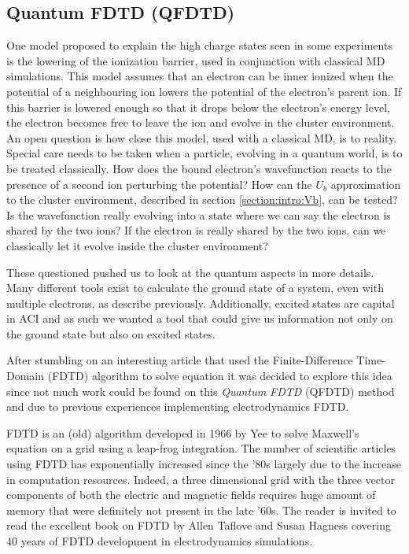 \subsection{Quantum FDTD (QFDTD)}
\label{section:tools:qfdtd}


One model proposed to explain the high charge states seen in some experiments
is the lowering of the ionization barrier, used in conjunction with classical
MD simulations. This model assumes that an electron can be inner ionized when
the potential of a neighbouring ion lowers the potential of the electron's
parent ion. If this barrier is lowered enough so that it drops below the
electron's energy level, the electron becomes free to leave the ion and evolve
in the cluster environment. An open question is how close this model, used
with a classical MD, is to reality. Special care needs to be taken when a
particle, evolving in a quantum world, is to be treated classically. How does
the bound electron's wavefunction reacts to the presence of a second ion
perturbing the potential? How can the $U_b$ approximation to the cluster
environment, described in section \ref{section:intro:Vb}, can be tested?
Is the wavefunction really evolving into a state
where we can say the electron is shared by the two ions? If the electron is
really shared by the two ions, can we classically let it evolve inside the
cluster environment?

These questioned pushed us to look at the quantum aspects in more details. Many
different tools exist to calculate the ground state of a system, even with
multiple electrons, as describe previously. Additionally, excited states are
capital in ACI and as such we wanted a tool that could give us information not
only on the ground state but also on excited states.

After stumbling on an interesting article that used the Finite-Difference
Time-Domain (FDTD) algorithm to solve \schrodinger equation\cite{Sudiarta2007}
it was decided to explore this idea since not much work could be found on this
\textit{Quantum FDTD} (QFDTD) method and due to previous experiences
implementing electrodynamics FDTD.

FDTD is an (old) algorithm developed in 1966 by Yee\cite{Yee1966} to solve
Maxwell's equation on a grid using a leap-frog integration. The number of
scientific articles using FDTD has exponentially increased since the '80s
largely due to the increase in computation resources. Indeed, a three
dimensional grid with the three vector components of both the electric and
magnetic fields requires huge amount of memory that were definitely not present
in the late '60s. The reader is invited to read the excellent book on FDTD by
Allen Taflove and Susan Hagness\cite{Taflove2005} covering 40 years of FDTD
development in electrodynamics simulations.

